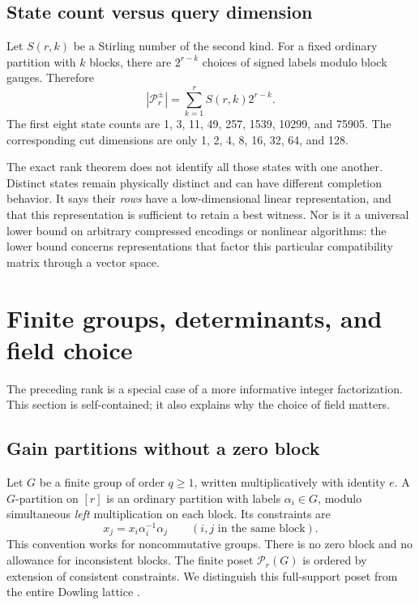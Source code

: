 \documentclass[11pt,letterpaper]{article}
\theoremstyle{definition}
\newcommand{\SP}{\mathcal P_r^{\pm}}
\newcommand{\PG}{\mathcal P_r(G)}
\begin{document}
\subsection{State count versus query dimension}
Let $S(r,k)$ be a Stirling number of the second kind. For a fixed ordinary partition with $k$ blocks, there are $2^{r-k}$ choices of signed labels modulo block gauges. Therefore
\begin{equation}\label{eq:signed-count}
 |\SP|=\sum_{k=1}^r S(r,k)2^{r-k}.
\end{equation}
The first eight state counts are 1, 3, 11, 49, 257, 1539, 10299, and 75905. The corresponding cut dimensions are only 1, 2, 4, 8, 16, 32, 64, and 128.

The exact rank theorem does not identify all those states with one another. Distinct states remain physically distinct and can have different completion behavior. It says their \emph{rows} have a low-dimensional linear representation, and that this representation is sufficient to retain a best witness. Nor is it a universal lower bound on arbitrary compressed encodings or nonlinear algorithms: the lower bound concerns representations that factor this particular compatibility matrix through a vector space.

\section{Finite groups, determinants, and field choice}
\label{sec:groups}
The preceding rank is a special case of a more informative integer factorization. This section is self-contained; it also explains why the choice of field matters.

\subsection{Gain partitions without a zero block}
Let $G$ be a finite group of order $q\ge1$, written multiplicatively with identity $e$. A $G$-partition on $[r]$ is an ordinary partition with labels $\alpha_i\in G$, modulo simultaneous \emph{left} multiplication on each block. Its constraints are
\begin{equation}\label{eq:group-constraints}
 x_j=x_i\alpha_i^{-1}\alpha_j
 \qquad(i,j\text{ in the same block}).
\end{equation}
This convention works for noncommutative groups. There is no zero block and no allowance for inconsistent blocks. The finite poset $\PG$ is ordered by extension of consistent constraints. We distinguish this full-support poset from the entire Dowling lattice \cite{dowling}.
\end{document}
